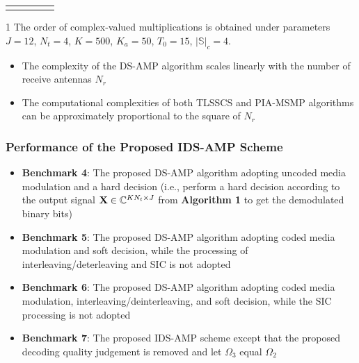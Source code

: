 \documentclass[9pt]{beamer}
\begin{document}
\begin{frame}
\begin{table}[!t]
\begin{threeparttable}
\begin{tabular}{|p{2.8cm}|p{3cm}|p{6cm}|p{1.5cm}|p{1.5cm}|}
\hline
\Xhline{1.2pt}
\end{tabular}
\begin{tablenotes}
\scriptsize
\item[1] The order of complex-valued multiplications is obtained under parameters $J=12$, $N_t=4$, $K=500$, $K_a=50$, $T_0=15$, $|\mathbb{S}|_c=4$.
\end{tablenotes}
\end{threeparttable}
\end{table}
\begin{itemize}
\item
The complexity of the DS-AMP algorithm scales linearly with the number of receive antennas $N_r$
\item
The computational complexities of both TLSSCS and PIA-MSMP algorithms can be approximately proportional to the square of $N_r$
\end{itemize}
\end{frame}

\begin{frame}
\frametitle{Performance of the Proposed IDS-AMP Scheme}
\begin{itemize}
\item
{\bf Benchmark 4}: The proposed DS-AMP algorithm adopting uncoded media modulation and a hard decision (i.e., perform a hard decision according to the output signal ${\bf X}\in\mathbb{C}^{KN_t\times J}$ from {\bf Algorithm 1} to get the demodulated binary bits)
\item
{\bf Benchmark 5}: The proposed DS-AMP algorithm adopting coded media modulation and soft decision, while the processing of interleaving/deterleaving and SIC is not adopted
\item
{\bf Benchmark 6}: The proposed DS-AMP algorithm adopting coded media modulation, interleaving/deinterleaving, and soft decision, while the SIC processing is not adopted
\item
{\bf Benchmark 7}: The proposed IDS-AMP scheme except that the proposed decoding quality judgement is removed and let $\Omega_3$ equal $\Omega_2$
\end{itemize}
\end{frame}
\end{document}
